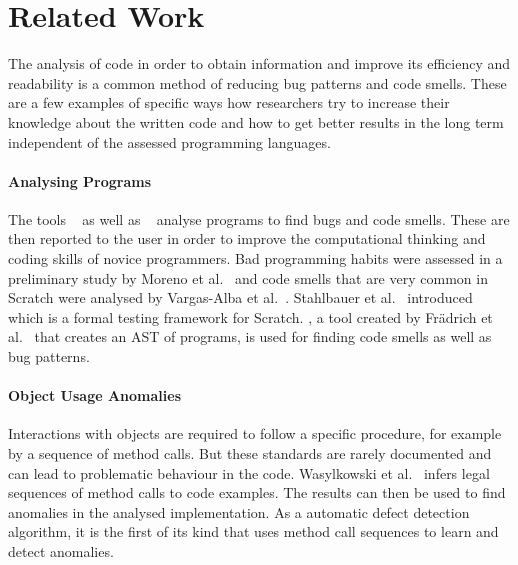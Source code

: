\section{Related Work}\label{sec:related-work}
The analysis of code in order to obtain information and improve its efficiency and readability is a common method of reducing bug patterns and code smells. These are a few examples of specific ways how researchers try to increase their knowledge about the written code and how to get better results in the long term independent of the assessed programming languages.

\paragraph{Analysing \scratch{} Programs}
The tools \drscratch{}~\cite{drscratch} as well as \hairball{}~\cite{hairball} analyse \scratch{} programs to find bugs and code smells. These are then reported to the user in order to improve the computational thinking and coding skills of novice programmers. Bad programming habits were assessed in a preliminary study by Moreno et al.~\cite{badhabits} and code smells that are very common in Scratch were analysed by Vargas-Alba et al.~\cite{badsmells}. Stahlbauer et al.~\cite{whisker} introduced \whisker{} which is a formal testing framework for Scratch. \litterbox, a tool created by Frädrich et al.~\cite{scratch_bugpatterns} that creates an AST of \scratch{} programs, is used for finding code smells as well as bug patterns.

\paragraph{Object Usage Anomalies}
Interactions with objects are required to follow a specific procedure, for example by a sequence of method calls. But these standards are rarely documented and can lead to problematic behaviour in the code. Wasylkowski et al.~\cite{object_usage} infers legal sequences of method calls to code examples. The results can then be used to find anomalies in the analysed implementation. As a automatic defect detection algorithm, it is the first of its kind that uses method call sequences to learn and detect anomalies.

